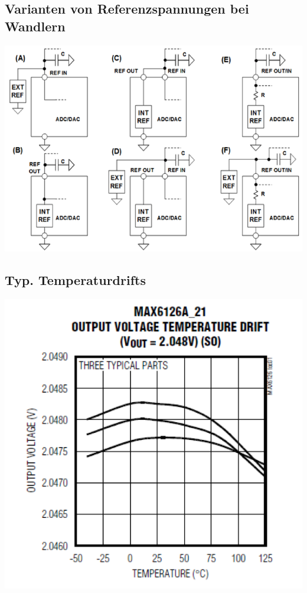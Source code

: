 \vspace*{0.1cm}\begin{minipage}[t]{12cm}
	\subsection{Varianten von Referenzspannungen bei Wandlern}
		\includegraphics[scale=0.3]{images/variantenReferenzspannungen}
\end{minipage}
\begin{minipage}[t]{6cm}
	\subsection{Typ. Temperaturdrifts}
		 \includegraphics[scale=0.3]{images/typTempDrift.png}
\end{minipage}
